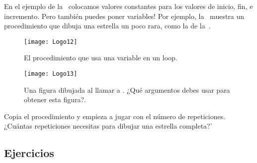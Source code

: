En el ejemplo de la~ colocamos valores constantes
para los valores de inicio, fin, e incremento. Pero también puedes
poner variables! Por ejemplo, la~ muestra un
procedimiento que dibuja una estrella un poco rara, como la de
la~.

\begin{figure}[H]
  \centering
  \texttt{[image: Logo12]}
  \caption{El procedimiento  que usa una
    variable  en un loop.}
  \label{fig:Logo12}
\end{figure}

\begin{figure}[H]
  \centering
  \texttt{[image: Logo13]}
  \caption{Una figura dibujada al llamar a
    . ¿Qué argumentos debes usar para obtener
    esta figura?.}
  \label{fig:Logo13}
\end{figure}

Copia el procedimiento  y empieza a jugar con
el número de repeticiones. ¿Cuántas repeticiones necesitas para
dibujar una estrella completa?'

\subsection*{Ejercicios}

